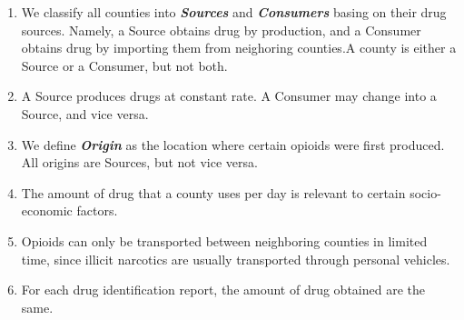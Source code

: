 \begin{enumerate}[$\mathcal{A}$1.]
	\item We classify all counties into \textbf{\itshape Sources} and \textbf{\itshape Consumers} basing on their drug sources. Namely, a Source obtains drug by production, and a Consumer obtains drug by importing them from neighoring counties.A county is either a Source or a Consumer, but not both.
	
	\item A Source produces drugs at constant rate. A Consumer may change into a Source, and vice versa.
	
	\item We define \textbf{\itshape Origin} as the location where certain opioids were first produced. All origins are Sources, but not vice versa.
	
	\item The amount of drug that a county uses per day is relevant to certain socio-economic factors.
	
	\item Opioids can only be transported between neighboring counties in limited time, since illicit narcotics are usually transported through personal vehicles.\cite{9}
	
	\item For each drug identification report, the amount of drug obtained are the same. 
\end{enumerate}